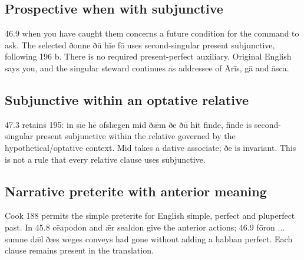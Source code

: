 \subsection*{Prospective when with subjunctive}

46.9 when you have caught them concerns a future condition for the command to ask. The selected ðonne ðū hīe fō uses second-singular present subjunctive, following 196 b. There is no required present-perfect auxiliary. Original English says you, and the singular steward continues as addressee of Ārīs, gā and āsca.

\subsection*{Subjunctive within an optative relative}

47.3 retains 195: in sīe hē ofslægen mid ðǣm ðe ðū hit finde, finde is second-singular present subjunctive within the relative governed by the hypothetical/\allowbreak{}optative context. Mid takes a dative associate; ðe is invariant. This is not a rule that every relative clause uses subjunctive.

\subsection*{Narrative preterite with anterior meaning}

Cook 188 permits the simple preterite for English simple, perfect and pluperfect past. In 45.8 cēapodon and ǣr sealdon give the anterior actions; 46.9 fōron ... sumne dǣl ðæs weges conveys had gone without adding a habban perfect. Each clause remains present in the translation.

